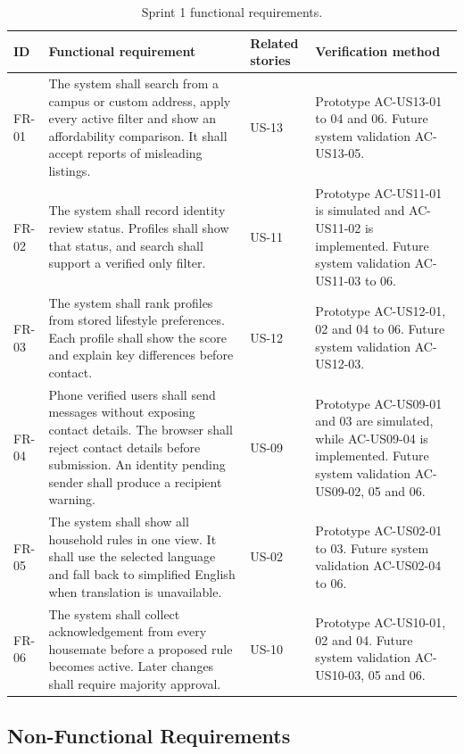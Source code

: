 \documentclass[11pt,a4paper]{article}
\begin{document}
\begin{table}[H]
    \centering
    \small
    \caption{Sprint 1 functional requirements.}
    \begin{tabularx}{\textwidth}{@{}L{1.7cm}Y L{1.7cm}L{4.4cm}@{}}
        \toprule
        ID & Functional requirement & Related stories & Verification method\\
        \midrule
        FR-01 & The system shall search from a campus or custom address, apply every active filter and show an affordability comparison. It shall accept reports of misleading listings. & US-13 & Prototype AC-US13-01 to 04 and 06. Future system validation AC-US13-05.\\
        FR-02 & The system shall record identity review status. Profiles shall show that status, and search shall support a verified only filter. & US-11 & Prototype AC-US11-01 is simulated and AC-US11-02 is implemented. Future system validation AC-US11-03 to 06.\\
        FR-03 & The system shall rank profiles from stored lifestyle preferences. Each profile shall show the score and explain key differences before contact. & US-12 & Prototype AC-US12-01, 02 and 04 to 06. Future system validation AC-US12-03.\\
        FR-04 & Phone verified users shall send messages without exposing contact details. The browser shall reject contact details before submission. An identity pending sender shall produce a recipient warning. & US-09 & Prototype AC-US09-01 and 03 are simulated, while AC-US09-04 is implemented. Future system validation AC-US09-02, 05 and 06.\\
        FR-05 & The system shall show all household rules in one view. It shall use the selected language and fall back to simplified English when translation is unavailable. & US-02 & Prototype AC-US02-01 to 03. Future system validation AC-US02-04 to 06.\\
        FR-06 & The system shall collect acknowledgement from every housemate before a proposed rule becomes active. Later changes shall require majority approval. & US-10 & Prototype AC-US10-01, 02 and 04. Future system validation AC-US10-03, 05 and 06.\\
        \bottomrule
    \end{tabularx}
    \label{tabfunctionalrequirements}
\end{table}

\subsection{Non-Functional Requirements}
\end{document}
